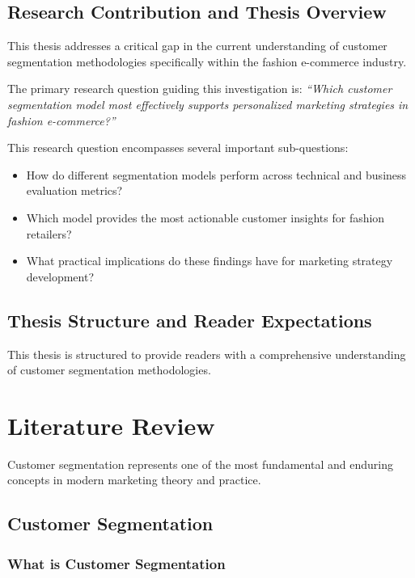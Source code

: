 \documentclass[12pt, a4paper, oneside]{report}
\begin{document}
\section{Research Contribution and Thesis Overview}

This thesis addresses a critical gap in the current understanding of customer segmentation methodologies specifically within the fashion e-commerce industry.

The primary research question guiding this investigation is: \textit{``Which customer segmentation model most effectively supports personalized marketing strategies in fashion e-commerce?''}

This research question encompasses several important sub-questions:
\begin{itemize}
    \item How do different segmentation models perform across technical and business evaluation metrics?
    \item Which model provides the most actionable customer insights for fashion retailers?
    \item What practical implications do these findings have for marketing strategy development?
\end{itemize}


\section{Thesis Structure and Reader Expectations}

This thesis is structured to provide readers with a comprehensive understanding of customer segmentation methodologies.


\chapter{Literature Review}

Customer segmentation represents one of the most fundamental and enduring concepts in modern marketing theory and practice.

\section{Customer Segmentation}

\subsection{What is Customer Segmentation}
\end{document}
